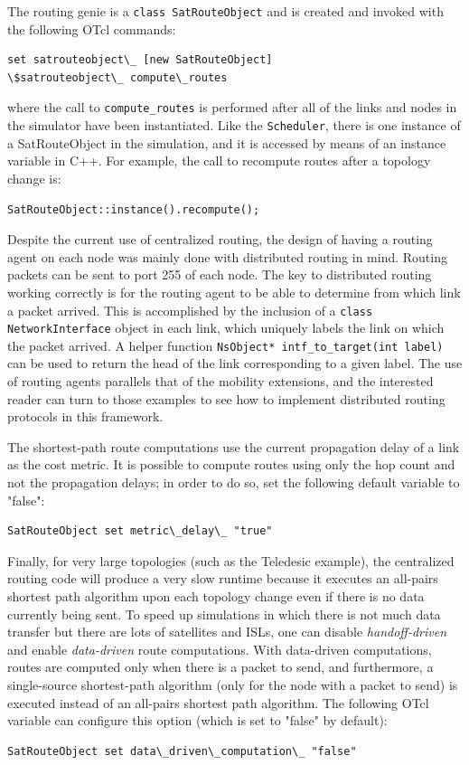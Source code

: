 The routing genie is a {\tt class SatRouteObject} and is created and
invoked with the following OTcl commands:
\begin{verbatim}
set satrouteobject\_ [new SatRouteObject]
\$satrouteobject\_ compute\_routes
\end{verbatim}
where the call to {\tt compute\_routes} is performed after all of the
links and nodes in the simulator have been instantiated.
Like the {\tt Scheduler}, there is one instance of a SatRouteObject in the
simulation, and it is accessed by means of an instance variable in C++.
For example, the call to recompute routes after a topology change is:
\begin{verbatim}
SatRouteObject::instance().recompute();
\end{verbatim}

Despite the current use of centralized routing, the design of having
a routing agent on each node was mainly done with distributed routing 
in mind.  Routing packets can be sent to port 255 of each node.  The key
to distributed routing working correctly is for the routing agent to
be able to 
determine from which link a packet arrived.  This is accomplished by the
inclusion of a {\tt class NetworkInterface} object in each link, which
uniquely labels the link on which the packet arrived.  A helper function
{\tt NsObject* intf\_to\_target(int label)} can be used to return the head 
of the
link corresponding to a given label.  The use of routing agents parallels
that of the mobility extensions, and the interested reader can turn to
those examples to see how to implement distributed routing protocols in
this framework.

The shortest-path route computations use the current propagation delay of
a link as the cost metric.  It is possible to compute routes using only
the hop count and not the propagation delays; in order to do so, set
the following default variable to "false":
\begin{verbatim}
SatRouteObject set metric\_delay\_ "true"
\end{verbatim}

Finally, for very large topologies (such as the Teledesic example), the 
centralized routing code will produce a very slow runtime because it executes
an all-pairs shortest path algorithm upon each topology change even if
there is no data currently being sent.  To speed up simulations in which
there is not much data transfer but there are lots of satellites and
ISLs, one can disable {\em handoff-driven} and enable {\em data-driven} 
route computations.  With data-driven computations, routes are computed
only when there is a packet to send, and furthermore, a single-source
shortest-path algorithm (only for the node with a packet to send) is 
executed instead of an all-pairs shortest path algorithm.  The following
OTcl variable can configure this option (which is set to "false" by
default):
\begin{verbatim}
SatRouteObject set data\_driven\_computation\_ "false"
\end{verbatim}



